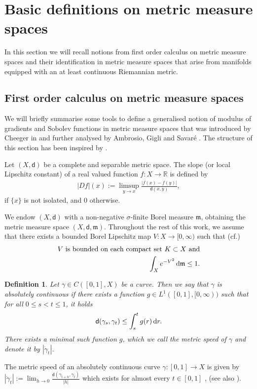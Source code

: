 \documentclass[a4paper,10pt]{article}
\newtheorem{definition}[theorem]{Definition}
\numberwithin{equation}{section}
\newcommand{\R}{\mathbb{R}}
\newcommand{\sfd}{\mathsf d}
\newcommand{\di}{{\rm d}}
\begin{document}
\section{Basic definitions on metric measure spaces}\label{sec:2}
In this section we will recall notions from first order calculus on metric measure spaces and their identification in metric measure spaces that arise from manifolds equipped with an at least continuous Riemannian metric. 
\subsection{First order calculus on metric measure spaces}\label{subsec:2.1}
We will briefly summarise some tools to define a generalised notion of modulus of gradients and Sobolev functions in metric measure spaces that was introduced by Cheeger in \cite{cheeger1999differentiability} and further analysed by Ambrosio, Gigli and Savaré  \cite{ambrosio2014inventio}. The structure of this section has been inspired by \cite{mondino2025equivalence}.

Let $(X, \sfd)$ be a complete and separable metric space. The slope (or local Lipschitz constant) of a real valued function $f: X \to \R$ is defined by
\begin{align*}
    |Df|(x) := \limsup_{y \to x}\frac{|f(x)-f(y)|}{\sfd(x, y)},
\end{align*}
if $\{x\}$ is not isolated, and $0$ otherwise.

We endow $(X,\sfd)$ with a non-negative $\sigma$-finite Borel  measure $\mathfrak{m}$, obtaining the metric measure space $(X, \sfd, \mathfrak{m})$.
Throughout the rest of this work, we assume that there exists a bounded Borel Lipschitz map $V: X \to [0, \infty)$ such that  (cf.\@ \cite[Section\,4]{ambrosio2014inventio})
\begin{equation}\label{condition_on_measure_bounded_compression}
\begin{split}
    V\ \mathrm{is\ bounded\ on\ each\ compact\ set\ } K \subset X \ \mathrm{and}  \\
    \int_X e^{-V^2} \, \di\mathfrak{m} \leq 1. 
    \end{split}
\end{equation}
\begin{definition}
    Let $\gamma \in C([0,1],X)$ be a curve. Then we say that $\gamma$ is absolutely continuous if there exists a function $g \in L^1([0,1], [0, \infty))$ such that for all $0 \leq s<t \leq 1$, it holds
    \begin{align*}
        \sfd(\gamma_s, \gamma_t) \leq \int_s^t g(r) \, \di r.
    \end{align*}
    There exists a minimal such function $g$, which we call the metric speed of $\gamma$ and denote it by $|\dot{\gamma}_t|$. 
\end{definition}
The metric speed of an absolutely continuous curve $\gamma:[0,1] \to X$ is given by  $|\dot{\gamma}_t|:= \lim_{h \to 0}\frac{\sfd(\gamma_{t+h}, \gamma_t)}{|h|}$ {which exists for almost every $t \in [0,1]$} \cite{ambrosio1990metric}, (see also \cite{kirchheim1994rectifiable}).
\end{document}
